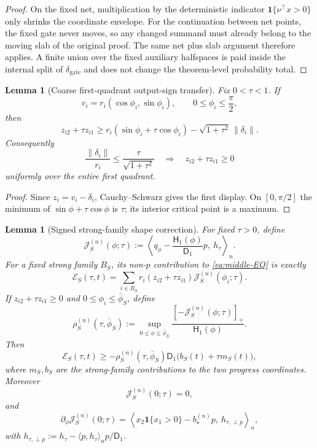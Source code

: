 \documentclass{article} %
\theoremstyle{plain}
\newtheorem{lemma}[theorem]{Lemma}
\theoremstyle{definition}
\theoremstyle{remark}
\begin{document}
\begin{proof}
On the fixed net, multiplication by the deterministic indicator
$\mathbf 1\{\nu^\top x>0\}$ only shrinks the coordinate envelope.  For the
continuation between net points, the fixed gate never moves, so any changed
summand must already belong to the moving slab of the original proof.  The
same net plus slab argument therefore applies.  A finite union over
the fixed auxiliary halfspaces is paid inside the internal split of
$\delta_{\mathrm{gate}}$ and does not change the theorem-level probability
total.
\end{proof}


\begin{lemma}[Coarse first-quadrant output-sign transfer]
\label{lem:first-quadrant-output-sign}
Fix $0<\tau<1$.  If
\[
v_i=r_i(\cos\phi_i,\sin\phi_i),
\qquad
0\le\phi_i\le\frac\pi2,
\]
then
\[
\boxed{
z_{i2}+\tau z_{i1}
\ge
r_i(\sin\phi_i+\tau\cos\phi_i)
-
\sqrt{1+\tau^2}\,\|\delta_i\|.
}
\tag{output-sign-transfer}\label{eq:output-sign-transfer}
\]
Consequently
\[
\boxed{
\frac{\|\delta_i\|}{r_i}
\le
\frac{\tau}{\sqrt{1+\tau^2}}
\quad\Longrightarrow\quad
z_{i2}+\tau z_{i1}\ge0
}
\tag{coarse-sign-guard}\label{eq:coarse-sign-guard}
\]
uniformly over the entire first quadrant.
\end{lemma}

\begin{proof}
Since $z_i=v_i-\delta_i$, Cauchy--Schwarz gives the first display.  On
$[0,\pi/2]$ the minimum of
$\sin\phi+\tau\cos\phi$ is $\tau$; its interior critical point is a maximum.
\end{proof}

\begin{lemma}[Signed strong-family shape correction]
\label{lem:signed-strong-creation-kernel}
For fixed $\tau>0$, define
\[
\mathcal J_S^{(n)}(\phi;\tau)
:=
\left\langle
q_\phi-
\frac{\mathsf H_1(\phi)}{\mathsf D_1}p,
\ h_\tau
\right\rangle_n.
\]
For a fixed strong family $B_S$, its non-$p$ contribution to
\eqref{eq:middle-EQ} is exactly
\[
\boxed{
\mathcal E_S(\tau,t)
=
\sum_{i\in B_S}
r_i(z_{i2}+\tau z_{i1})
\mathcal J_S^{(n)}(\phi_i;\tau).
}
\tag{strong-shape-exact}\label{eq:strong-shape-exact}
\]
If $z_{i2}+\tau z_{i1}\ge0$ and
$0\le\phi_i\le\bar\phi_S$, define
\[
\rho_S^{(n)}(\tau,\bar\phi_S)
:=
\sup_{0\le\phi\le\bar\phi_S}
\frac{[-\mathcal J_S^{(n)}(\phi;\tau)]_+}{\mathsf H_1(\phi)}.
\]
Then
\[
\boxed{
\mathcal E_S(\tau,t)
\ge
-\rho_S^{(n)}(\tau,\bar\phi_S)
\mathsf D_1
\bigl(b_S(t)+\tau m_S(t)\bigr),
}
\tag{strong-shape-bound}\label{eq:strong-shape-bound}
\]
where $m_S,b_S$ are the strong-family contributions to the two progress
coordinates.  Moreover
\[
\mathcal J_S^{(n)}(0;\tau)=0,
\]
and
\[
\boxed{
\partial_\phi\mathcal J_S^{(n)}(0;\tau)
=
\left\langle
x_2\mathbf 1\{x_1>0\}
-b_\star^{(n)}p,
\ h_{\tau,\perp p}
\right\rangle_n,
}
\tag{strong-shape-derivative}\label{eq:strong-shape-derivative}
\]
with
$h_{\tau,\perp p}:=h_\tau-\langle p,h_\tau\rangle_np/\mathsf D_1$.
\end{lemma}
\end{document}
